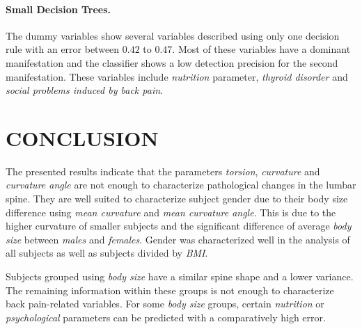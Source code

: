 \documentclass[a4paper,twoside]{style/article}
\newcommand{\com}[1]{\textcolor{orange}{\uline{#1}}}
\begin{document}
\paragraph{Small Decision Trees. }
The dummy variables show several variables described using only one decision rule with an error between $0.42$ to $0.47$.
Most of these variables have a dominant manifestation and the classifier shows a low detection precision for the second manifestation.
These variables include \emph{nutrition} parameter, \emph{thyroid disorder} and \emph{social problems induced by back pain}.




\section{\uppercase{Conclusion}}
\label{sec:Conclusion}
\noindent The presented results indicate that the parameters \emph{torsion}, \emph{curvature} and \emph{curvature angle} are not enough to characterize pathological changes in the lumbar spine.
They are well suited to characterize subject gender due to their body size difference using \emph{mean curvature} and \emph{mean curvature angle}.
This is due to the higher curvature of smaller subjects and the significant difference of average \emph{body size} between \emph{males} and \emph{females}.
Gender was characterized well in the analysis of all subjects as well as subjects divided by \emph{BMI}.

Subjects grouped using \emph{body size} have a similar spine shape and a lower variance.
The remaining information within these groups is not enough to characterize back pain-related variables.
For some \emph{body size} groups, certain \emph{nutrition} or \emph{psychological} parameters can be predicted with a comparatively high error.
\end{document}
